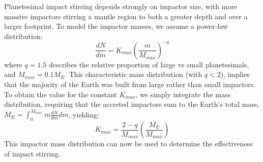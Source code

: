 Planetesimal impact stirring depends strongly on impactor size, with more massive impactors stirring a mantle region to both a greater depth and over a larger footprint.
To model the impactor masses, we assume a power-law distribution:
\begin{equation}
  \frac{dN}{dm} = {K_{max}\left(\frac{m}{M_{max}}\right)^{-q}}
\end{equation}
where $q=1.5$ describes the relative proportion of large vs small planetesimals, and $M_{max}=0.1 M_E$.
This characteristic mass distribution (with $q<2$), implies that the majority of the Earth was built from large rather than small impactors.
To obtain the value for the constant $K_{max}$, we simply integrate the mass distribution, requiring that the accreted impactors sum to the Earth's total mass, ${M_E = \int_0^{M_{max}} m \frac{dN}{dm}dm}$, yielding:
\begin{equation}
  K_{max} = \frac{2-q}{M_{max}}\left(\frac{M_E}{M_{max}}\right)
\end{equation}
This impactor mass distribution can now be used to determine the effectiveness of impact stirring.

